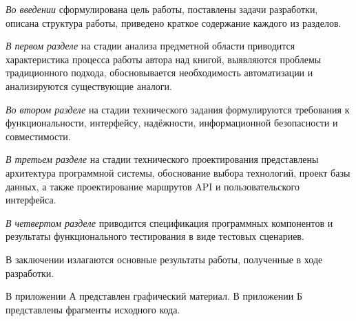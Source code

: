 \emph{Во введении} сформулирована цель работы, поставлены задачи разработки, описана структура работы, приведено краткое содержание каждого из разделов.

\emph{В первом разделе} на стадии анализа предметной области приводится характеристика процесса работы автора над книгой, выявляются проблемы традиционного подхода, обосновывается необходимость автоматизации и анализируются существующие аналоги.

\emph{Во втором разделе} на стадии технического задания формулируются требования к функциональности, интерфейсу, надёжности, информационной безопасности и совместимости.

\emph{В третьем разделе} на стадии технического проектирования представлены архитектура программной системы, обоснование выбора технологий, проект базы данных, а также проектирование маршрутов API и пользовательского интерфейса.

\emph{В четвертом разделе} приводится спецификация программных компонентов и результаты функционального тестирования в виде тестовых сценариев.

В заключении излагаются основные результаты работы, полученные в ходе разработки.

В приложении А представлен графический материал.
В приложении Б представлены фрагменты исходного кода. 
